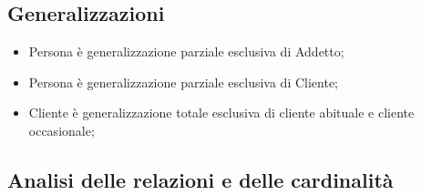 \subsection{Generalizzazioni}

\begin{itemize}
    \item Persona è generalizzazione parziale esclusiva di Addetto;
    \item Persona è generalizzazione parziale esclusiva di Cliente;
    \item Cliente è generalizzazione totale esclusiva di cliente abituale e cliente occasionale;
\end{itemize}

\subsection{Analisi delle relazioni e delle cardinalità}

